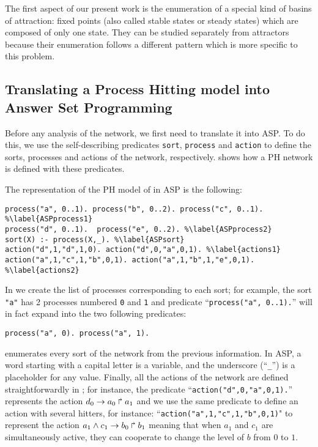 
The first aspect of our present work is the enumeration of a special kind of basins of attraction: fixed points (also called stable states or steady states) which are composed of only one state.
They can be studied separately from attractors because their enumeration follows a different pattern which is more specific to this problem.

\subsection{Translating a Process Hitting model into Answer Set Programming}
Before any analysis of the network,
we first need to translate it into ASP\benchmarksfootnote.
To do this, we use the self-describing predicates
\texttt{sort}, \texttt{process} and \texttt{action} to define the sorts, processes and actions of the network, respectively.
 shows how a PH network is defined with these predicates.

\begin{example}
\label{ex:asp-ph}
The representation of the PH model of  in ASP is the following:
\begin{lstlisting}
process("a", 0..1). process("b", 0..2). process("c", 0..1). %\label{ASPprocess1}
process("d", 0..1).  process("e", 0..2). %\label{ASPprocess2}
sort(X) :- process(X,_). %\label{ASPsort}
action("d",1,"d",1,0). action("d",0,"a",0,1). %\label{actions1}
action("a",1,"c",1,"b",0,1). action("a",1,"b",1,"e",0,1). %\label{actions2}
\end{lstlisting}
In  we create the list of processes corresponding to each sort;
for example, the sort \texttt{"a"} has 2 processes numbered \texttt{0} and \texttt{1} and
predicate ``\texttt{process("a", 0..1).}'' will in fact expand into the two following predicates:
\addtocounter{lstnumber}{-1}
\begin{lstlisting}[numbers=none]
process("a", 0). process("a", 1).
\end{lstlisting}
 enumerates every sort of the network from the previous information.
In ASP, a word starting with a capital letter is a variable,
and the underscore (``\texttt{\_}'') is a placeholder for any value.
Finally, all the actions of the network are defined straightforwardly in ;
for instance, the predicate ``\texttt{action("d",0,"a",0,1).}'' represents the action
$d_0\rightarrow a_0\Rsh a_1$ and we use the same predicate to define an action with several hitters, for instance: ``\texttt{action("a",1,"c",1,"b",0,1)}" to represent the action $a_1 \wedge c_1\rightarrow b_0\Rsh b_1$ meaning that when $a_1$ and $c_1$ are simultaneously active, they can cooperate to change the level of $b$ from $0$ to $1$.
\end{example}

